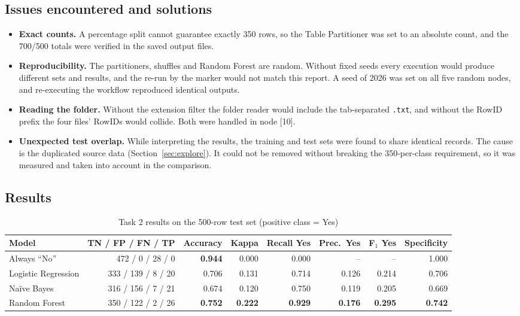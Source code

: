 \documentclass[11pt,a4paper]{article}
\newcommand{\cd}[1]{\texttt{#1}}
\begin{document}
\subsection{Issues encountered and solutions}
\begin{itemize}
  \item \textbf{Exact counts.} A percentage split cannot guarantee exactly 350 rows, so the Table Partitioner was set to
        an absolute count, and the 700/500 totals were verified in the saved output files.
  \item \textbf{Reproducibility.} The partitioners, shuffles and Random Forest are random. Without fixed seeds every
        execution would produce different sets and results, and the re-run by the marker would not match this report.
        A seed of 2026 was set on all five random nodes, and re-executing the workflow reproduced identical outputs.
  \item \textbf{Reading the folder.} Without the extension filter the folder reader would include the tab-separated
        \cd{.txt}, and without the RowID prefix the four files' RowIDs would collide. Both were handled in node [10].
  \item \textbf{Unexpected test overlap.} While interpreting the results, the training and test sets were found to
        share identical records. The cause is the duplicated source data (Section~\ref{sec:explore}). It could not be
        removed without breaking the 350-per-class requirement, so it was measured and taken into account in the
        comparison.
\end{itemize}

\subsection{Results}
\begin{table}[H]\centering\small
\caption{Task 2 results on the 500-row test set (positive class = Yes)}\label{tab:t2res}
\setlength{\tabcolsep}{4.5pt}\begin{tabular}{@{}lrrrrrrr@{}}\toprule
Model & TN / FP / FN / TP & Accuracy & Kappa & Recall Yes & Prec.\ Yes & F$_1$ Yes & Specificity \\ \midrule
Always ``No'' & 472 / 0 / 28 / 0 & \textbf{0.944} & 0.000 & 0.000 & -- & -- & 1.000 \\
Logistic Regression & 333 / 139 / 8 / 20 & 0.706 & 0.131 & 0.714 & 0.126 & 0.214 & 0.706 \\
Naïve Bayes & 316 / 156 / 7 / 21 & 0.674 & 0.120 & 0.750 & 0.119 & 0.205 & 0.669 \\
Random Forest & 350 / 122 / 2 / 26 & \textbf{0.752} & \textbf{0.222} & \textbf{0.929} & \textbf{0.176} &
  \textbf{0.295} & \textbf{0.742} \\ \bottomrule
\end{tabular}
\end{table}
\end{document}
